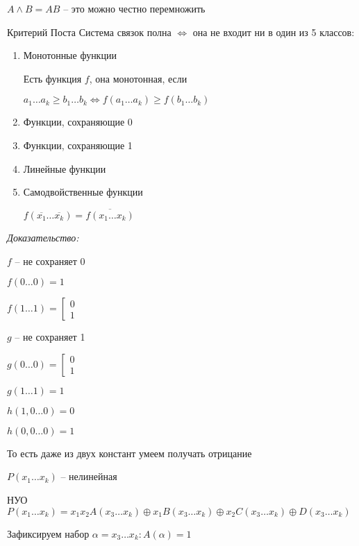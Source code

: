 \documentclass[12pt]{article}
\begin{document}
$A \land B = AB$ -- это можно честно перемножить

\begin{theo}{Критерий Поста}
    Система связок полна $\Leftrightarrow$ она не входит ни в один из 5 классов:

    \begin{enumerate}
        \item Монотонные функции
        
        Есть функция $f$, она монотонная, если 
        
        $a_1 \ldots a_k \geq b_1 \ldots b_k \Leftrightarrow f(a_1 \ldots a_k) \geq f(b_1 \ldots b_k)$

        \item Функции, сохраняющие 0
        \item Функции, сохраняющие 1
        \item Линейные функции 
        \item Самодвойственные функции
        
        $f(\overline{x_1} \ldots \overline{x_k}) = \overline{f(x_1 \ldots x_k)}$
    \end{enumerate}
\end{theo}

\textit{Доказательство:}

$f$ -- не сохраняет 0

$f(0 \ldots 0) = 1$

$f(1 \ldots 1) = \left[ \begin{gathered}
    0 \\
    1
\end{gathered} \right.$

$g$ -- не сохраняет 1

$g(0 \ldots 0) = \left[ \begin{gathered}
    0 \\
    1
\end{gathered} \right.$

$g(1 \ldots 1) = 1$

$h(1, 0 \ldots 0) = 0$

$h(0, 0 \ldots 0) = 1$

То есть даже из двух констант умеем получать отрицание

$P(x_1 \ldots x_k)$ -- нелинейная

НУО $P(x_1 \ldots x_k) = x_1x_2A(x_3 \ldots x_k) \oplus x_1B(x_3 \ldots x_k) \oplus x_2C(x_3 \ldots x_k) \oplus D(x_3 \ldots x_k)$

Зафиксируем набор $\alpha = x_3 \ldots x_k : A(\alpha) = 1$
\end{document}
